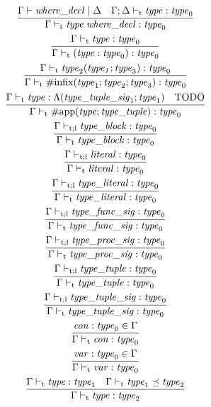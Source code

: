 \begin{gather*}
    \infer{\Gamma \vdash_\mathrm{t} \mathit{type}\; \mathit{where\_decl}: \mathit{type}_0}{
        \Gamma \vdash \mathit{where\_decl} \mid \Delta
        &
        \Gamma; \Delta \vdash_\mathrm{t} \mathit{type}: \mathit{type}_0
    }
    \\
    \infer{\Gamma \vdash_\mathrm{t} (\mathit{type}: \mathit{type}_0): \mathit{type}_0}{
        \Gamma \vdash_\mathrm{t} \mathit{type}: \mathit{type}_0
    }
    \\
    \infer{\Gamma \vdash_\mathrm{t} \mathrm{\#infix}(\mathit{type}_1; \mathit{type}_2; \mathit{type}_3): \mathit{type}_0}{
        \Gamma \vdash_\mathrm{t} \mathit{type}_2(\mathit{type_1}; \mathit{type}_3): \mathit{type}_0
    }
    \\
    \infer{\Gamma \vdash_\mathrm{t} \mathrm{\#app}(\mathit{type}; \mathit{type\_tuple}): \mathit{type}_0}{
        \Gamma \vdash_\mathrm{t} \mathit{type}: \Lambda(\mathit{type\_tuple\_sig}_1; \mathit{type}_1)
        &
        \text{TODO}
    }
    \\
    \infer{\Gamma \vdash_\mathrm{t} \mathit{type\_block}: \mathit{type}_0}{
        \Gamma \vdash_{\mathrm{t}; \mathrm{l}} \mathit{type\_block}: \mathit{type}_0
    }
    \\
    \infer{\Gamma \vdash_\mathrm{t} \mathit{literal}: \mathit{type}_0}{
        \Gamma \vdash_{\mathrm{t}; \mathrm{l}} \mathit{literal}: \mathit{type}_0
    }
    \\
    \infer{\Gamma \vdash_\mathrm{t} \mathit{type\_literal}: \mathit{type}_0}{
        \Gamma \vdash_{\mathrm{t}; \mathrm{l}} \mathit{type\_literal}: \mathit{type}_0
    }
    \\
    \infer{\Gamma \vdash_\mathrm{t} \mathit{type\_func\_sig}: \mathit{type}_0}{
        \Gamma \vdash_{\mathrm{t}; \mathrm{l}} \mathit{type\_func\_sig}: \mathit{type}_0
    }
    \\
    \infer{\Gamma \vdash_\mathrm{t} \mathit{type\_proc\_sig}: \mathit{type}_0}{
        \Gamma \vdash_{\mathrm{t}; \mathrm{l}} \mathit{type\_proc\_sig}: \mathit{type}_0
    }
    \\
    \infer{\Gamma \vdash_\mathrm{t} \mathit{type\_tuple}: \mathit{type}_0}{
        \Gamma \vdash_{\mathrm{t}; \mathrm{l}} \mathit{type\_tuple}: \mathit{type}_0
    }
    \\
    \infer{\Gamma \vdash_\mathrm{t} \mathit{type\_tuple\_sig}: \mathit{type}_0}{
        \Gamma \vdash_{\mathrm{t}; \mathrm{l}} \mathit{type\_tuple\_sig}: \mathit{type}_0
    }
    \\
    \infer{\Gamma \vdash_\mathrm{t} \mathit{con}: \mathit{type}_0}{
        \mathit{con}: \mathit{type}_0 \in \Gamma
    }
    \\
    \infer{\Gamma \vdash_\mathrm{t} \mathit{var}: \mathit{type}_0}{
        \mathit{var}: \mathit{type}_0 \in \Gamma
    }
    \\
    \infer{\Gamma \vdash_\mathrm{t} \mathit{type}: \mathit{type}_2}{
        \Gamma \vdash_\mathrm{t} \mathit{type}: \mathit{type}_1
        &
        \Gamma \vdash_\mathrm{t} \mathit{type}_1 \preceq \mathit{type}_2
    }
\end{gather*}

